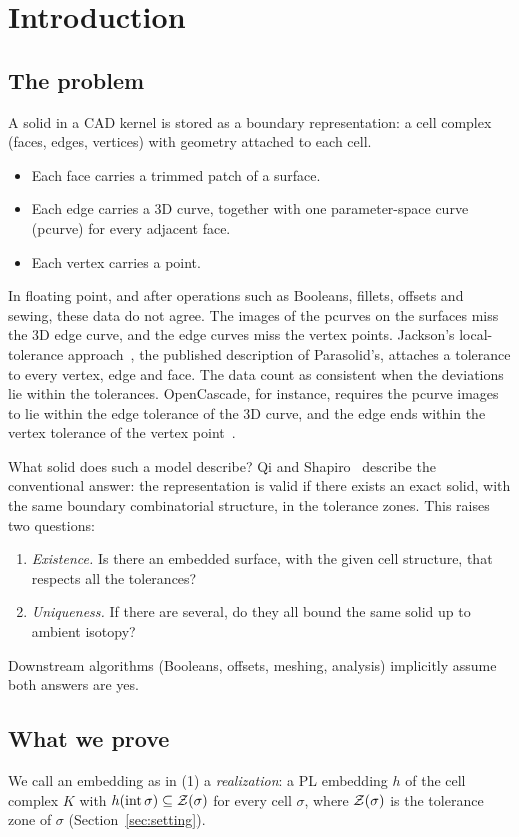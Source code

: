 \section{Introduction}\label{sec:intro}

\subsection{The problem}
A solid in a CAD kernel is stored as a boundary representation: a cell complex (faces, edges, vertices) with
geometry attached to each cell.
\begin{itemize}
\item Each face carries a trimmed patch of a surface.
\item Each edge carries a 3D curve, together with one parameter-space curve (pcurve) for every adjacent face.
\item Each vertex carries a point.
\end{itemize}
In floating point, and after operations such as Booleans, fillets, offsets and sewing, these data do not agree.
The images of the pcurves on the surfaces miss the 3D edge curve, and the edge curves miss the vertex points.
Jackson's local-tolerance approach~\cite{Jackson95}, the published description of Parasolid's, attaches a
tolerance to every vertex, edge and face. The data count as consistent when the deviations lie within the
tolerances. OpenCascade, for instance, requires the pcurve images to lie within the edge tolerance of the 3D curve,
and the edge ends within the vertex tolerance of the vertex point~\cite{OCCT}.

What solid does such a model describe? Qi and Shapiro~\cite{QiShapiro06b} describe the conventional answer: the
representation is valid if there exists an exact solid, with the same boundary combinatorial structure, in the
tolerance zones. This raises two questions:
\begin{enumerate}
\item \emph{Existence.} Is there an embedded surface, with the given cell structure, that respects all the
tolerances?
\item \emph{Uniqueness.} If there are several, do they all bound the same solid up to ambient isotopy?
\end{enumerate}
Downstream algorithms (Booleans, offsets, meshing, analysis) implicitly assume both answers are yes.

\subsection{What we prove}
We call an embedding as in (1) a \emph{realization}: a PL embedding $h$ of the cell complex $K$ with
$h(\operatorname{int}\sigma)\subseteq\mathcal{Z}(\sigma)$ for every cell $\sigma$, where $\mathcal{Z}(\sigma)$ is the tolerance zone of $\sigma$
(Section~\ref{sec:setting}).

